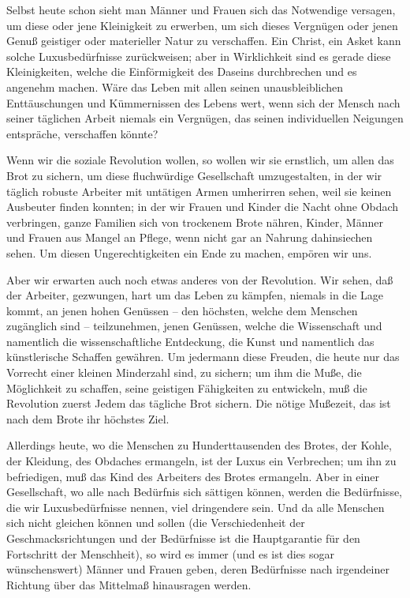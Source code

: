 \documentclass{scrbook}
\begin{document}
Selbst heute schon sieht man Männer und Frauen sich das Notwendige versagen, um diese oder jene Kleinigkeit zu erwerben, um sich dieses Vergnügen oder jenen Genuß geistiger oder materieller Natur zu verschaffen. Ein Christ, ein Asket kann solche Luxusbedürfnisse zurückweisen; aber in Wirklichkeit sind es gerade diese Kleinigkeiten, welche die Einförmigkeit des Daseins durchbrechen und es angenehm machen. Wäre das Leben mit allen seinen unausbleiblichen Enttäuschungen und Kümmernissen des Lebens wert, wenn sich der Mensch nach seiner täglichen Arbeit niemals ein Vergnügen, das seinen individuellen Neigungen entspräche, verschaffen könnte?

Wenn wir die soziale Revolution wollen, so wollen wir sie ernstlich, um allen das Brot zu sichern, um diese fluchwürdige Gesellschaft umzugestalten, in der wir täglich robuste Arbeiter mit untätigen Armen umherirren sehen, weil sie keinen Ausbeuter finden konnten; in der wir Frauen und Kinder die Nacht ohne Obdach verbringen, ganze Familien sich von trockenem Brote nähren, Kinder, Männer und Frauen aus Mangel an Pflege, wenn nicht gar an Nahrung dahinsiechen sehen. Um diesen Ungerechtigkeiten ein Ende zu machen, empören wir uns.

Aber wir erwarten auch noch etwas anderes von der Revolution. Wir sehen, daß der Arbeiter, gezwungen, hart um das Leben zu kämpfen, niemals in die Lage kommt, an jenen hohen Genüssen – den höchsten, welche dem Menschen zugänglich sind – teilzunehmen, jenen Genüssen, welche die Wissenschaft und namentlich die wissenschaftliche Entdeckung, die Kunst und namentlich das künstlerische Schaffen gewähren. Um jedermann diese Freuden, die heute nur das Vorrecht einer kleinen Minderzahl sind, zu sichern; um ihm die Muße, die Möglichkeit zu schaffen, seine geistigen Fähigkeiten zu entwickeln, muß die Revolution zuerst Jedem das tägliche Brot sichern. Die nötige Mußezeit, das ist nach dem Brote ihr höchstes Ziel.

Allerdings heute, wo die Menschen zu Hunderttausenden des Brotes, der Kohle, der Kleidung, des Obdaches ermangeln, ist der Luxus ein Verbrechen; um ihn zu befriedigen, muß das Kind des Arbeiters des Brotes ermangeln. Aber in einer Gesellschaft, wo alle nach Bedürfnis sich sättigen können, werden die Bedürfnisse, die wir Luxusbedürfnisse nennen, viel dringendere sein. Und da alle Menschen sich nicht gleichen können und sollen (die Verschiedenheit der Geschmacksrichtungen und der Bedürfnisse ist die Hauptgarantie für den Fortschritt der Menschheit), so wird es immer (und es ist dies sogar wünschenswert) Männer und Frauen geben, deren Bedürfnisse nach irgendeiner Richtung über das Mittelmaß hinausragen werden.
\end{document}
